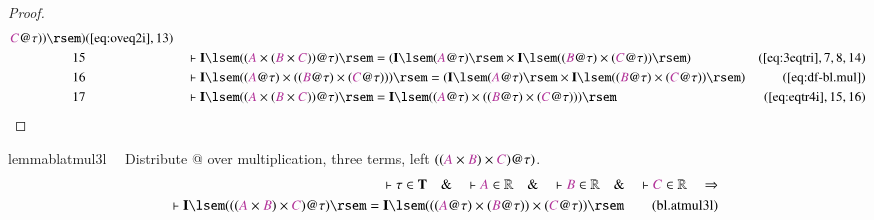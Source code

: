 \begin{proof}
\begin{align}
      \mc{C} @ \tau ) ) \rsem
      )&(\mbox{\ref{eq:oveq2i}},13)\notag
  \\ 15 &&  & \vdash \mathbf{I} \lsem ( ( \mc{A} \times ( \mc{B} \times \mc{C} )
      ) @ \tau ) \rsem = ( \mathbf{I} \lsem ( \mc{A} @ \tau
      ) \rsem \times \mathbf{I} \lsem ( ( \mc{B} @ \tau )
      \times ( \mc{C} @ \tau ) ) \rsem
      )&(\mbox{\ref{eq:3eqtri}},7,8,14)\notag
  \\ 16 &&  & \vdash \mathbf{I} \lsem ( ( \mc{A} @ \tau ) \times ( ( \mc{B} @
      \tau ) \times ( \mc{C} @ \tau ) ) ) \rsem = (
      \mathbf{I} \lsem ( \mc{A} @ \tau ) \rsem \times
      \mathbf{I} \lsem ( ( \mc{B} @ \tau ) \times ( \mc{C} @
      \tau ) ) \rsem )&(\mbox{\ref{eq:df-bl.mul}})\notag
  \\ 17 &&  & \vdash \mathbf{I} \lsem ( ( \mc{A} \times ( \mc{B} \times \mc{C} )
      ) @ \tau ) \rsem = \mathbf{I} \lsem ( ( \mc{A} @ \tau
      ) \times ( ( \mc{B} @ \tau ) \times ( \mc{C} @ \tau ) )
      ) \rsem&(\mbox{\ref{eq:eqtr4i}},15,16)\notag
\end{align}
\end{proof}

\begin{restatable}{lemma}{blatmul3l}~~ Distribute @ over multiplication, three
terms, left $( ( \mc{A} \times \mc{B} ) \times \mc{C} ) @ \tau )$.
\begin{align}
\vdash \tau \in \mathbf{T}\quad\&\quad \vdash \mc{A} \in \mathbb{R}\quad\&\quad
    \vdash \mc{B} \in \mathbb{R}\quad\&\quad \vdash \mc{C} \in
    \mathbb{R}\quad\Rightarrow \notag \\ %
      \quad \vdash \mathbf{I} \lsem ( ( ( \mc{A} \times
    \mc{B} ) \times \mc{C} ) @ \tau ) \rsem = \mathbf{I} \lsem ( ( ( \mc{A} @
    \tau ) \times ( \mc{B} @ \tau ) ) \times ( \mc{C} @ \tau ) )
    \rsem\label{eq:bl.atmul3l}\tag{bl.atmul3l}
\end{align}
\end{restatable}

